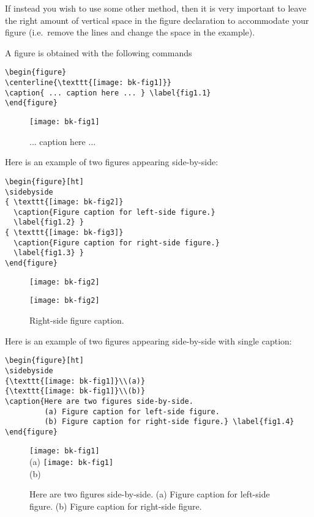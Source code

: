 If instead you wish to use some other method, then it is very
important to leave the right amount of vertical space in the figure
declaration to accommodate your figure (i.e.~remove the lines and
change the space in the example).

A figure is obtained with the following commands
\begin{verbatim}
\begin{figure}
\centerline{\texttt{[image: bk-fig1]}}
\caption{ ... caption here ... } \label{fig1.1}
\end{figure}
\end{verbatim}

\begin{figure}
\centerline{\texttt{[image: bk-fig1]}}
\caption{ ... caption here ... }
\label{fig1.1}
\end{figure}

Here is an example of two figures appearing side-by-side:
\begin{verbatim}
\begin{figure}[ht]
\sidebyside
{ \texttt{[image: bk-fig2]}
  \caption{Figure caption for left-side figure.}
  \label{fig1.2} }
{ \texttt{[image: bk-fig3]}
  \caption{Figure caption for right-side figure.}
  \label{fig1.3} }
\end{figure}
\end{verbatim}

\begin{figure}[ht]
\sidebyside
{
    \texttt{[image: bk-fig2]}
    \caption{Left-side figure caption.}\label{fig1.2}
}{
    \texttt{[image: bk-fig2]}
    \caption{Right-side figure caption.}\label{fig1.3}
}
\end{figure}

Here is an example of two figures appearing side-by-side with single caption:

\begin{verbatim}
\begin{figure}[ht]
\sidebyside
{\texttt{[image: bk-fig1]}\\(a)}
{\texttt{[image: bk-fig1]}\\(b)}
\caption{Here are two figures side-by-side.
         (a) Figure caption for left-side figure.
         (b) Figure caption for right-side figure.} \label{fig1.4}
\end{figure}
\end{verbatim}

\begin{figure}[ht]
\sidebyside
{
\texttt{[image: bk-fig1]}\\(a)
}
{
\texttt{[image: bk-fig1]}\\(b)
}
\caption{Here are two figures side-by-side.
         (a) Figure caption for left-side figure.
         (b) Figure caption for right-side figure.} \label{fig1.4}
\end{figure}


